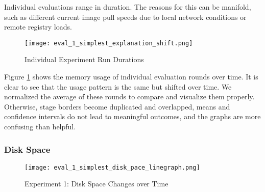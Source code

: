 Individual evaluations range in duration.
The reasons for this can be manifold, such as different current image pull speeds due to local network conditions or remote registry loads.
\begin{figure}[h]
    \begin{adjustwidth}{-0.2\paperwidth}{-0.2\paperwidth}
        \centering
        \texttt{[image: eval\_1\_simplest\_explanation\_shift.png]}
        \caption{Individual Experiment Run Durations}
        \label{fig:eval_1_simplest_explanation_shift}
    \end{adjustwidth}
\end{figure}
Figure \ref{fig:eval_1_simplest_explanation_shift} shows the memory usage of individual evaluation rounds over time.
It is clear to see that the usage pattern is the same but shifted over time.
We normalized the average of these rounds to compare and visualize them properly.
Otherwise, stage borders become duplicated and overlapped, means and confidence intervals do not lead to meaningful outcomes, and the graphs are more confusing than helpful.

\subsubsection{Disk Space}

\begin{figure}[h]
    \begin{adjustwidth}{-0.2\paperwidth}{-0.2\paperwidth}
        \centering
        \texttt{[image: eval\_1\_simplest\_disk\_pace\_linegraph.png]}
        \caption{Experiment 1: Disk Space Changes over Time}
        \label{fig:eval_1_simplest_disk_space}
    \end{adjustwidth}
\end{figure}

